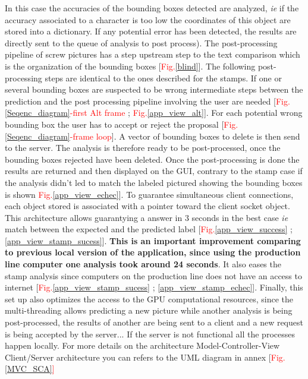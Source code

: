 \documentclass[12pt, french, a4paper]{article} %
\begin{document}
In this case the accuracies of the bounding boxes detected are analyzed, \textit{ie} if the accuracy associated to a character is too low the coordinates of this object are stored into a dictionary. If any potential error has been detected, the results are directly sent to the queue of analysis to post process). The post-processing pipeline of screw pictures has a step upstream step to the text comparison which is the organization of the bounding boxes [\textcolor{red}{Fig.}\ref{blind}]. The following post-processing steps are identical to the ones described for the stamps. If one or several bounding boxes are suspected to be wrong intermediate steps between the prediction and the post processing pipeline involving the user are needed [\textcolor{red}{Fig.}\ref{Seqenc_diagram}\textcolor{red}{-first Alt frame} ; \textcolor{red}{Fig.}\ref{app_view_alt}]. For each potential wrong bounding box the user has to accept or reject the proposal [\textcolor{red}{Fig.}\ref{Seqenc_diagram}\textcolor{red}{-frame loop}]. A vector of bounding boxes to delete is then send to the server. The analysis is therefore ready to be post-processed, once the bounding boxes rejected have been deleted. Once the post-processing is done the results are returned and then displayed on the \gls{GUI}, contrary to the stamp case if the analysis didn't led to match the labeled pictured showing the bounding boxes is shown \textcolor{red}{Fig.}\ref{app_view_echec}]. To guarantee simultaneous client connections, each object stored is associated with a pointer toward the client socket object. This architecture allows guarantying a answer in 3 seconds in the best case \textit{ie} match between the expected and the predicted label [\textcolor{red}{Fig.}\ref{app_view_success} ;\ref{app_view_stamp_sucess}]. \textbf{This is an important improvement comparing to previous local version of the application, since using the production line computer one analysis took around 24 seconds}. It also eases the stamp analysis since computers on the production line does not have an access to internet [\textcolor{red}{Fig.}\ref{app_view_stamp_sucess} ; \ref{app_view_stamp_echec}]. Finally, this set up also optimizes the access to the GPU computational resources, since the multi-threading allows predicting a new picture while another analysis is being post-processed, the results of another are being sent to a client and a new request is being accepted by the server... If the server is not functional all the processes happen locally. For more details on the architecture Model-Controller-View Client/Server architecture you can refers to the UML diagram in annex 
[\textcolor{red}{Fig.}\ref{MVC_SCA}\textcolor{red}]
\end{document}
